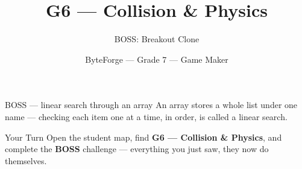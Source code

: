 \documentclass[aspectratio=169]{beamer}
\title{G6 — Collision \& Physics}
\subtitle{BOSS: Breakout Clone}
\author{ByteForge --- Grade 7 --- Game Maker}
\date{}
\begin{document}
\begin{frame}
    \titlepage
\end{frame}

\begin{frame}{BOSS — linear search through an array}
    \Large
    An array stores a whole list under one name — checking each item one at a time, in order, is called a linear search.
\end{frame}

\begin{frame}{Your Turn}
    \Large
    Open the student map, find \textbf{G6 — Collision \& Physics}, and complete
    the \textbf{BOSS} challenge --- everything you just saw, they now do themselves.
\end{frame}
\end{document}
